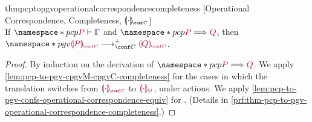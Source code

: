 \documentclass[main.tex]{subfiles}
\begin{document}
\begin{restatabletheorem}{thmpcptopgvoperationalcorrespondencecompleteness}%
  [Operational Correspondence, Completeness, $\cpgvC{\cdot}$]
  \label{thm:pcp-to-pgv-operational-correspondence-completeness}
  \hfill\\%
  If $\pcp{\seq{P}{\ty{\Gamma}}}$ and $\pcp{\tm{P}\red\tm{Q}}$,
  then $\pgv{\tm{\cpgvC{P}}\cred^+\tm{\cpgvC{Q}}}$.
\end{restatabletheorem}
\begin{proof}
  By induction on the derivation of $\pcp{\tm{P}\red\tm{Q}}$.
  We apply \cref{lem:pcp-to-pgv-cpgvM-cpgvC-completeness} for the cases in which
  the translation switches from $\tm{\cpgvC{\cdot}}$ to $\tm{\cpgvM{\cdot}}$,
  \ie under actions.
  We apply \cref{lem:pcp-to-pgv-confs-operational-correspondence-equiv} for
  . 
  (Details in \cref{prf:thm-pcp-to-pgv-operational-correspondence-completeness}.)
  
\end{proof}
\end{document}
